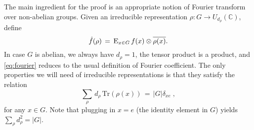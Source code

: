 \documentclass{report}
\theoremstyle{plain}
\theoremstyle{definition}
\theoremstyle{remark}
\newcommand{\Es}[1]{\textsc{E}_{#1}}
\newcommand{\C}{\ensuremath{\mathbb{C}}}
\numberwithin{equation}{subsection}
\begin{document}
The main ingredient for the proof is an appropriate notion of Fourier transform over non-abelian groups. Given an irreducible representation $\rho: G \to U_{d_\rho}(\C)$, define 
\begin{equation}\label{eq:fourier}
 \hat{f}(\rho) \,=\, \Es{x\in G} \,f(x) \otimes \overline{\rho(x)}.
\end{equation}
In case $G$ is abelian, we always have $d_\rho=1$, the tensor product is a product, and \eqref{eq:fourier} reduces to the usual definition of Fourier coefficient. The only properties we will need of irreducible representations is that they satisfy the relation
\begin{equation}\label{eq:ortho}
\sum_\rho \,d_\rho\,\mathrm{Tr}(\rho(x)) \,=\, |G|\delta_{xe}\;,
\end{equation}
for any $x\in G$. Note that plugging in $x=e$ (the identity element in $G$) yields $\sum_\rho d_\rho^2= |G|$. 
\end{document}
